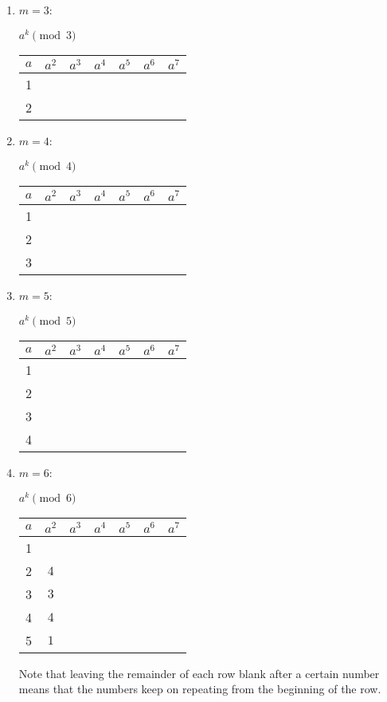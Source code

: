 \begin{enumerate}
\item $m = 3$:

$a^k \pmod{3}$
\begin{tabular}{|c | c | c| c| c| c | c|}
\hline
$a$ & $a^2$ & $a^3$ & $a^4$& $a^5$& $a^6$ & $a^7$ \\
\hline
1	& &	&	&	&	&	\\
\hline
2	& &	&	&	&	&	\\
\hline
\end{tabular}
\item $m = 4$:

$a^k \pmod{4}$
\begin{tabular}{|c | c | c| c| c| c | c|}
\hline
$a$ & $a^2$ & $a^3$ & $a^4$& $a^5$& $a^6$ & $a^7$ \\
\hline
1	& &	&	&	&	&	\\
\hline
2	& &	&	&	&	&	\\
\hline
3	& &	&	&	&	&	\\
\hline
\end{tabular}
\item $m = 5$:

$a^k \pmod{5}$
\begin{tabular}{|c | c | c| c| c| c | c|}
\hline
$a$ & $a^2$ & $a^3$ & $a^4$& $a^5$& $a^6$ & $a^7$ \\
\hline
1	& &	&	&	&	&	\\
\hline
2	& &	&	&	&	&	\\
\hline
3	& &	&	&	&	&	\\
\hline
4	& &	&	&	&	&	\\
\hline
\end{tabular}
\item $m = 6$:

$a^k \pmod{6}$
\begin{tabular}{|c | c | c| c| c| c | c|}
\hline
$a$ & $a^2$ & $a^3$ & $a^4$& $a^5$& $a^6$ & $a^7$ \\
\hline
1	&  &	&	&	&	&	\\
\hline
2	& $4$ & 	&	&	&	&	\\
\hline
3	& $3$ &	&	&	&	&	\\
\hline
4	& $4$ &	&	&	&	&	\\
\hline
5	& $1$ &	&	&	&	&	\\
\hline
\end{tabular}

Note that leaving the remainder of each row blank after a certain number means that the numbers keep on repeating from the beginning of the row.


\end{enumerate}
